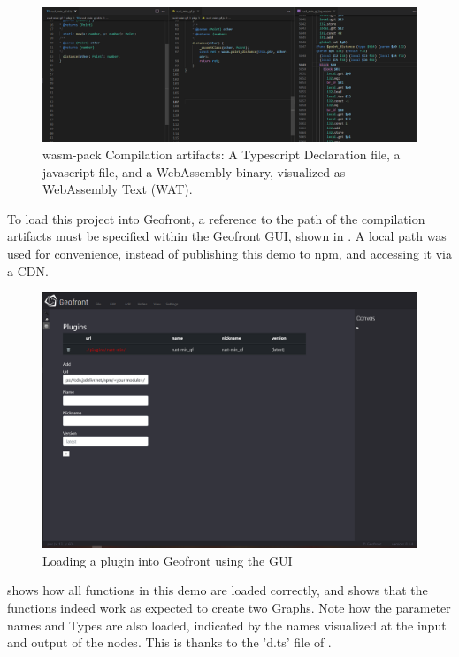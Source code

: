 \begin{figure}
  \graphicspath{{../../assets/images/6.1.1/}}
  \centering
  \includegraphics[width=\linewidth]{13.PNG}
  \caption[compilation artifacts]{wasm-pack Compilation artifacts: A Typescript Declaration file, a javascript file, and a WebAssembly binary, visualized as WebAssembly Text (WAT). }
  \label{fig:rust-plugin:compilation-results}
\end{figure}

To load this project into Geofront, a reference to the path of the compilation artifacts must be specified within the Geofront GUI, shown in .
A local path was used for convenience, instead of publishing this demo to npm, and accessing it via a \ac{CDN}.

\begin{figure}
  \graphicspath{{../../assets/images/6.1.1/}}
  \centering
  \includegraphics[width=0.50\linewidth]{2.PNG}
  \caption[loading a plugin]{Loading a plugin into Geofront using the \ac{GUI}}
  \label{fig:min-rust-plugin-import}
\end{figure}

 shows how all functions in this demo are loaded correctly, and  shows that the functions indeed work as expected to create two Graphs. 
Note how the parameter names and Types are also loaded, indicated by the names visualized at the input and output of the nodes.
This is thanks to the 'd.ts' file of .


